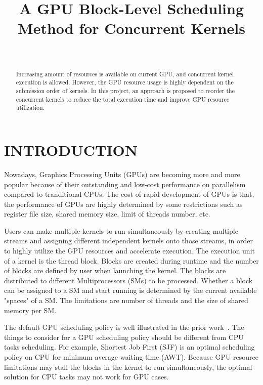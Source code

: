 \documentclass[conference]{IEEEtran}
\begin{document}
\title{\LARGE \bf A GPU Block-Level Scheduling Method for Concurrent Kernels}

\author{ \\
}

\maketitle

\begin{abstract}
Increasing amount of resources is available on current GPU, and concurrent kernel execution is allowed. However, the GPU resource usage is highly dependent on the submission order of kernels. In this project, an approach is proposed to reorder the concurrent kernels to reduce the total execution time and improve GPU resource utilization. 
\end{abstract}


\section{INTRODUCTION}
Nowadays, Graphics Processing Units (GPUs) are becoming more and more popular because of their outstanding and low-cost performance on parallelism compared to tranditional CPUs. The cost of rapid development of GPUs is that, the performance of GPUs are highly determined by some restrictions such as register file size, shared memory size, limit of threads number, etc. 

Users can make multiple kernels to run simultaneously by creating multiple streams and assigning different independent kernels onto those streams, in order to highly utilize the GPU resources and accelerate execution. The execution unit of a kernel is the thread block. Blocks are created during runtime and the number of blocks are defined by user when launching the kernel. The blocks are distributed to different Multiprocessors (SMs) to be processed. Whether a block can be assigned to a SM and start running is determined by the current available "spaces" of a SM. The limitations are number of threads and the size of shared memory per SM.

The default GPU scheduling policy is well illustrated in the prior work~\cite{c1}. The things to consider for a GPU scheduling policy should be different from CPU tasks scheduling. For example, Shortest Job First (SJF) is an optimal scheduling policy on CPU for minimum average waiting time (AWT). Because GPU resource limitations may stall the blocks in the kernel to run simultaneously, the optimal solution for CPU tasks may not work for GPU cases.
\end{document}
